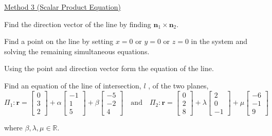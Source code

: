\documentclass[11pt,a4paper]{book}
\newcommand{\R}{\mathbb{R}}
\begin{document}
\uline{Method 3 (Scalar Product Equation)}

\begin{steps}[leftmargin=2cm]

\item Find the direction vector of the line by finding $\textbf{n}_{1}\times\textbf{n}_{2}$.

\item Find a point on the line by setting $x=0$ or $y=0$ or $z=0$
in the system and solving the remaining simultaneous equations.

\item Using the point and direction vector form the equation of the
line.

\end{steps}

\begin{example}

Find an equation of the line of intersection, $l$ , of the two planes,
\[
\Pi_{1}:\textbf{r}=\begin{bmatrix}0\\
3\\
2
\end{bmatrix}+\alpha\begin{bmatrix}-1\\
1\\
5
\end{bmatrix}+\beta\begin{bmatrix}-5\\
-2\\
4
\end{bmatrix}\quad\text{and}\quad\Pi_{2}:\textbf{r}=\begin{bmatrix}0\\
2\\
8
\end{bmatrix}+\lambda\begin{bmatrix}2\\
0\\
-1
\end{bmatrix}+\mu\begin{bmatrix}-6\\
-1\\
9
\end{bmatrix}
\]

where $\beta,\lambda,\mu\in\R$.

\Solution


\end{example}
\end{document}
